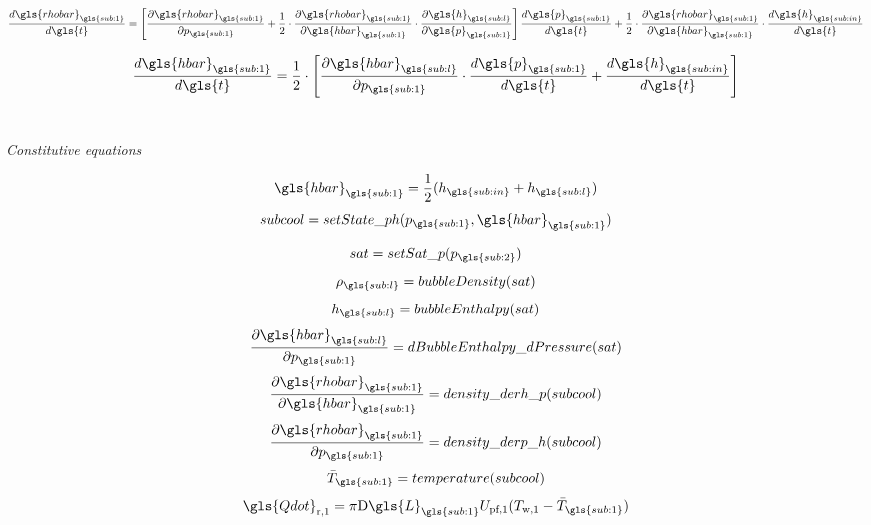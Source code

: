 \documentclass[11pt]{article} %
\begin{document}
\begin{equation}
\frac{d \gls{rhobar}_{\gls{sub:1}}}{d \gls{t}} = \left[ \frac{\partial \gls{rhobar}_{\gls{sub:1}}}{\partial p_{\gls{sub:1}}} + \frac{1}{2} \cdot \frac{\partial \gls{rhobar}_{\gls{sub:1}}}{\partial \gls{hbar}_{\gls{sub:1}}} \cdot \frac{\partial \gls{h}_{\gls{sub:l}}}{\partial \gls{p}_{\gls{sub:1}}}\right] \frac{d \gls{p}_{\gls{sub:1}}}{d \gls{t}} + \frac{1}{2} \cdot \frac{\partial \gls{rhobar}_{\gls{sub:1}}}{\partial \gls{hbar}_{\gls{sub:1}}}  \cdot \frac{d \gls{h}_{\gls{sub:in}}}{d \gls{t}}
\end{equation}


\begin{equation}
\frac{d \gls{hbar}_{\gls{sub:1}}}{d \gls{t}} = \frac{1}{2} \cdot \left[\frac{\partial \gls{hbar}_{\gls{sub:l}}}{\partial p_{\gls{sub:1}}} \cdot \frac{d \gls{p}_{\gls{sub:1}}}{d \gls{t}} + \frac{d \gls{h}_{\gls{sub:in}}}{d \gls{t}}\right]
\end{equation}
\\
\begin{center}
\textit{Constitutive equations}\\
\end{center}

\begin{equation}
\gls{hbar}_{\gls{sub:1}} =  \frac{1}{2}(h_{\gls{sub:in}} + {h}_{\gls{sub:l}})
\end{equation}
\begin{equation}
subcool = setState\_ph(p_{\gls{sub:1}},\gls{hbar}_{\gls{sub:1}})
\end{equation}

\begin{equation}
sat = setSat\_p(p_{\gls{sub:2}})
\end{equation}
\begin{equation}
\rho_{\gls{sub:l}} = bubbleDensity(sat)
\end{equation}
\begin{equation}
h_{\gls{sub:l}} = bubbleEnthalpy(sat)
\end{equation}
\begin{equation}
\frac{\partial \gls{hbar}_{\gls{sub:l}}}{\partial p_{\gls{sub:1}}}= dBubbleEnthalpy\_dPressure(sat)
\end{equation}
\begin{equation}
\frac{\partial \gls{rhobar}_{\gls{sub:1}}}{\partial \gls{hbar}_{\gls{sub:1}}}= density\_derh\_p(subcool)
\end{equation}
\begin{equation}
\frac{\partial \gls{rhobar}_{\gls{sub:1}}}{\partial p_{\gls{sub:1}}}= density\_derp\_h(subcool)
\end{equation}
\begin{equation}
\bar{T}_{\gls{sub:1}} = temperature(subcool)
\end{equation}
\begin{equation}
\gls{Qdot}_\text{r,1} = \pi \text{D} \gls{L}_{\gls{sub:1}} U_\text{pf,1} (T_\text{w,1} - \bar{T}_{\gls{sub:1}})
\end{equation}
\end{document}
